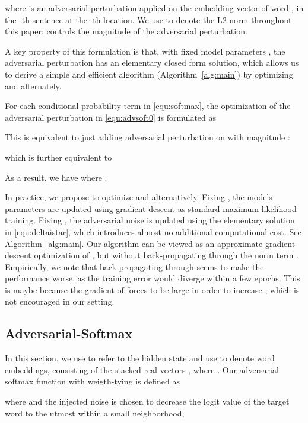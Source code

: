 \documentclass{article}
\begin{document}
where  is an adversarial perturbation applied on 
the embedding vector  of word , in the -th sentence at the -th location.  
We use  to denote the L2 norm throughout this paper; 
 controls the magnitude of the adversarial perturbation.   




A key property of this formulation is that, with fixed model parameters , 
the adversarial perturbation  has an elementary closed form solution, 
which allows us to derive a simple and efficient algorithm (Algorithm~\ref{alg:main}) by optimizing  and  alternately. 


\begin{thm}\label{thm:advh}
For each conditional probability term
  in \eqref{equ:softmax},
the optimization of the adversarial perturbation in \eqref{equ:advsoft0} is formulated as  

This is equivalent to just adding adversarial perturbation on   
with magnitude :

which is further equivalent to 

As a result, we have 
where . 
\end{thm}


In practice, we propose to optimize  and  alternatively.  Fixing , the models parameters   
are updated using  gradient descent as standard maximum likelihood training. 
Fixing , 
the adversarial noise  is updated using the elementary solution in 
\eqref{equ:deltaistar}, which introduces almost no additional computational cost. 
See Algorithm~\ref{alg:main}. 
Our algorithm can be viewed as an approximate gradient descent optimization of    
, but without back-propagating through the norm term . Empirically, we note that back-propagating through  
seems to make the performance worse, as
the training error would diverge within a few epochs.
This is maybe because the gradient of  forces  to be large in order to increase , which is not encouraged in our setting.






\iffalse 
\subsection{Adversarial-Softmax}
In this section, we use  to refer to the hidden state and 
use  to denote word embeddings, 
consisting of the stacked real vectors , where .
Our adversarial softmax function with weigth-tying 
is defined as 

where  and the injected noise 
is chosen to decrease the logit value of the target word to the utmost
within a small neighborhood,
\end{document}
